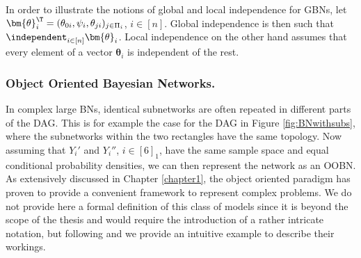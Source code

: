 In order to illustrate the notions of global and local independence for \glspl{GBN}, let $\bm{\theta}_i^\T=(\theta_{0i},\psi_i, \theta_{ji})_{j\in\Pi_i}$, $i\in[n]$. Global independence is then such that $\independent_{i\in[n]}\bm{\theta}_i$. Local independence on the other hand assumes that every element of a vector $\bm{\theta}_i$ is independent of the rest. 

\begin{comment}
\noindent
\textbf{Multinomial models.}
Assume each variable $Y_i$ is discrete and takes values in the space $\mathcal{Y}_i=\{0,\dots,r_i-1\}$. Let the conditional probability that $Y_i$ takes value $j\in\mathcal{Y}_i$ given that $\bm{Y}_{\Pi_i}=\bm{\pi}_i$ be equal to $\theta_{j\bm{\pi}_i}$. Then $Y_i\;|\;\bm{Y}_{\Pi_i}\sim Multi(\bm{\theta}_{i\bm{\pi}_i})$, where $\bm{\theta}_{i\bm{\pi}_i}^\T=(\theta_{j\bm{\pi}_i})_{j\in\mathcal{Y}_i}$. This is an instance of the contingency table model of Appendix \ref{appendixE13}, where in this case though the entries are conditional probabilities. Let $\bm{\theta}_i^\T=\left(\theta_{i\bm{\pi}}^\T\right)_{\bm{\pi}\in\mathcal{Y}_{\Pi_i}}$. Then global independence in this setting entails that $\independent_{i\in[n]}\bm{\theta}_i$, whilst from local independence it follows $\independent_{\bm{\pi}_i\in\mathcal{Y}_{\pi_i},j\in\mathcal{Y}_i}\theta_{j\bm{\pi}_i}$. 

Under the assumptions of local and global independence each $\bm{\theta}_{i\bm{\pi}_i}$ can be given an independent Dirichlet prior distribution and Bayesian updating can be performed locally for each of these parameters using the recursions shown in Appendix \ref{sec:multidir} when data comes from ancestral samples as formalized in Proposition \ref{prop:ancupd}.
\end{comment}
\noindent 
\subsubsection{Object Oriented Bayesian Networks.}
In complex large \glspl{BN}, identical subnetworks are often repeated in different parts of the \gls{DAG}. This is for example the case for the \gls{DAG} in Figure \ref{fig:BNwithsubs}, where the subnetworks within the two rectangles have the same topology. Now assuming that $Y_i'$ and $Y_i''$, $i\in [6]_1$, have the same sample space and equal conditional probability densities, we can then represent the network as an \gls{OOBN}. As extensively discussed in Chapter \ref{chapter1}, the object oriented paradigm has proven to provide a convenient framework to represent complex problems. We do not provide here a formal definition of this class of models \citep[which can be found in][]{Koller97} since it is beyond the scope of the thesis and would require the introduction of a rather intricate notation, but following \citet{Jensen2006} and \citet{Neil2000} we provide an intuitive example to describe their workings.
 
